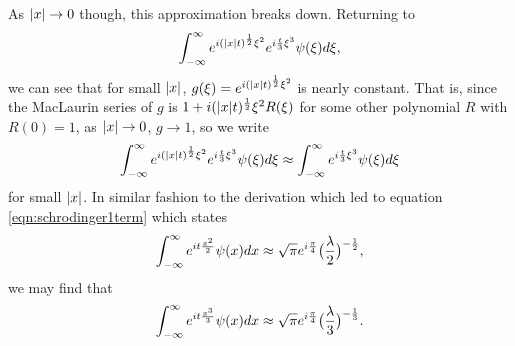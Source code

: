 As $\lvert x\rvert \to 0$ though, this approximation breaks down. Returning to
\[
	\int_{-\infty}^\infty e^{i(\lvert x\rvert t)^\frac{1}{2}\xi^2}e^{i\frac{t}{3}\xi^3}\psi(\xi)d\xi,
\]
we can see that for small $\lvert x\rvert$, $g(\xi) = e^{i(\lvert x\rvert t)^\frac{1}{2}\xi^2}$ is nearly constant. That is, since the MacLaurin series of $g$ is $1 + i(\lvert x\rvert t)^\frac{1}{2}\xi^2 R(\xi)$ for some other polynomial $R$ with $R(0) = 1$, as $\lvert x\rvert \to 0$, $g \to 1$, so we write
\[
	\int_{-\infty}^\infty e^{i(\lvert x\rvert t)^\frac{1}{2}\xi^2}e^{i\frac{t}{3}\xi^3}\psi(\xi)d\xi \approx \int_{-\infty}^\infty e^{i\frac{t}{3}\xi^3}\psi(\xi)d\xi
\]
for small $\lvert x\rvert$. In similar fashion to the derivation which led to equation \ref{eqn:schrodinger1term} which states
\[
\int_{-\infty}^\infty e^{it\frac{x^2}{2}}\psi(x)dx \approx \sqrt{\pi}e^{i\frac{\pi}{4}}\big(\frac{\lambda}{2}\big)^{-\frac{1}{2}},
\]
we may find that
\[
\int_{-\infty}^\infty e^{it\frac{x^3}{3}}\psi(x)dx \approx \sqrt{\pi}e^{i\frac{\pi}{4}}\big(\frac{\lambda}{3}\big)^{-\frac{1}{3}}.
\]


